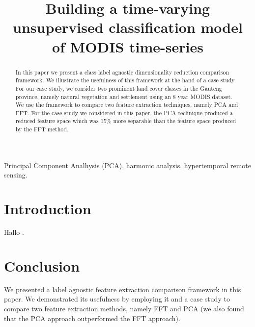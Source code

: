 \documentclass{article}
\title{Building a time-varying unsupervised classification model of MODIS time-series}
\begin{document}
%
\maketitle
%
\begin{abstract}
In this paper we present a class label agnostic dimensionality reduction comparison framework. 
We illustrate the usefulness of this framework at the hand of a case study. For our case study, we consider two prominent land cover classes in the Gauteng province, namely natural vegetation and settlement using an 8 year MODIS dataset. We use the framework to compare two 
feature extraction techniques, namely PCA and FFT. For the case study we considered in this paper, the PCA technique produced a reduced feature space which was 15\% more 
separable than the feature space produced by the FFT method.
\end{abstract}
%
\begin{keywords}
Principal Component Analhysis (PCA), harmonic analysis, hypertemporal remote sensing.
\end{keywords}
%

\section{Introduction}
\label{sec:intro}
Hallo \cite{almeida2015}.

\section{Conclusion}
\label{sec:ref}
We presented a label agnostic feature extraction comparison framework in this paper. We demonstrated its usefulness by employing it and a case study to compare two feature extraction methods,
namely FFT and PCA (we also found that the PCA approach outperformed the FFT approach).




\end{document}
